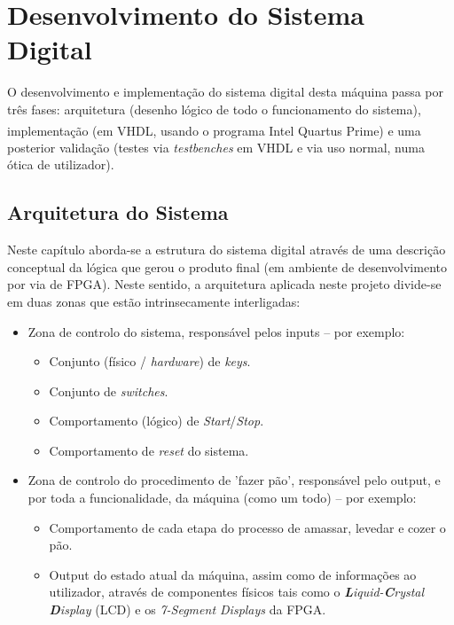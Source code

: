\documentclass{report}
\begin{document}
\chapter{Desenvolvimento do Sistema Digital}
\label{chap.desenvolvimentoSistemaDigital}
O desenvolvimento e implementação do sistema digital desta máquina passa por três fases: arquitetura (desenho lógico de todo o funcionamento do sistema), implementação (em VHDL, usando o programa Intel{\textsuperscript{\tiny{\textregistered}}} Quartus{\textsuperscript{\tiny{\textregistered}}} Prime) e uma posterior validação (testes via \textit{testbenches} em VHDL e via uso normal, numa ótica de utilizador).


\section{Arquitetura do Sistema}
Neste capítulo aborda-se a estrutura do sistema digital através de uma descrição conceptual da lógica que gerou o produto final (em ambiente de desenvolvimento por via de FPGA). Neste sentido, a arquitetura aplicada neste projeto divide-se em duas zonas que estão intrinsecamente interligadas:
\begin{itemize}
	\item Zona de controlo do sistema, responsável pelos inputs -- por exemplo:
	\begin{itemize}
		\item Conjunto (físico / \textit{hardware}) de \textit{keys}.
		\item Conjunto de \textit{switches}.
		\item Comportamento (lógico) de \textit{Start}/\textit{Stop}.
		\item Comportamento de \textit{reset} do sistema.
	\end{itemize}
	\item Zona de controlo do procedimento de 'fazer pão', responsável pelo output, e por toda a funcionalidade, da máquina (como um todo) -- por exemplo:
	\begin{itemize}
		\item Comportamento de cada etapa do processo de amassar, levedar e cozer o pão.
		\item Output do estado atual da máquina, assim como de informações ao utilizador, através de componentes físicos tais como o \textit{\textbf{L}iquid-\textbf{C}rystal \textbf{D}isplay} (LCD) e os \textit{7-Segment Displays} da FPGA.
	\end{itemize}
\end{itemize}
\end{document}
